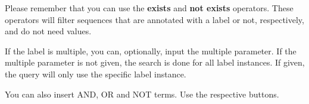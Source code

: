 Please remember that you can use the \textbf{exists} and \textbf{not exists} operators. These
operators will filter sequences that are annotated with a label or not, respectively, and do not need
values.

If the label is multiple, you can, optionally, input the multiple parameter. If the multiple parameter is
not given, the search is done for all label instances. If given, the query will only use the specific label instance.

You can also insert AND, OR and NOT terms. Use the respective buttons.

\begin{table}[H]
\end{table}
